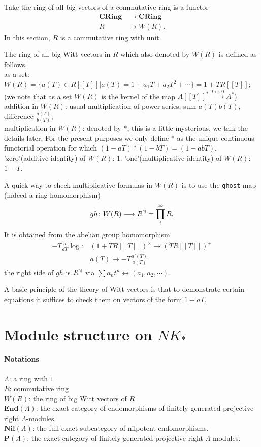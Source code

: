 Take the ring of all big vectors of a commutative ring is a functor 
\begin{align*}
\mathbf{CRing} &\longrightarrow \mathbf{CRing}\\
 R &\mapsto W(R).
\end{align*}
In this section, $R$ is a commutative ring with unit.
\begin{definition}
The ring of all big Witt vectors in $R$ which also denoted by $W(R)$ is defined as follows,\\
as a set: $W(R)=\{a(T)\in R[[T]]| a(T)=1+a_1T+a_2T^2+\cdots\}=1+TR[[T]]$; (we note that as a set $W(R)$ is the kernel of the map $A[[T]]^*\overset{T\mapsto 0}\longrightarrow A^*$)\\
addition in $W(R)$: usual multiplication of power series, sum $a(T)b(T)$, difference $\frac{a(T)}{b(T)}$;\\
multiplication in $W(R)$: denoted by $*$, this is a little mysterious, we talk the details later. For the present purposes we only define $*$ as the unique continuous functorial operation for which $(1-aT)*(1-bT)=(1-abT)$.\\
'zero'(additive identity) of $W(R)$: $1$.
'one'(multiplicative identity) of $W(R)$: $1-T$.
\end{definition}
A quick way to check multiplicative formulas in $W(R)$ is to use the \texttt{ghost} map (indeed a ring homomorphism)
\[gh\colon W(R)\longrightarrow R^{\mathbb{N}} =\prod_i^\infty R. \]
It is obtained from the abelian group homomorphism
\begin{align*}
-T \frac{d}{dT}\log \colon& (1+TR[[T]])^{\times} \longrightarrow (TR[[T]])^+\\
& a(T)\mapsto -T \frac{a'(T)}{a(T)}
\end{align*}
the right side of $gh$ is $R^{\mathbb{N}}$ via $\sum a_nt^n \longleftrightarrow (a_1,a_2,\cdots)$.

A basic principle of the theory of Witt vectors is that to demonstrate certain equations it suffices to check them on vectors of the form $1-aT$.
\section{Module structure on $NK_*$} %
\label{sec:module_structure_on_}
\paragraph{Notations} $\Lambda$: a ring with $1$\\
$R$: commutative ring \\
$W(R)$: the ring of big Witt vectors of $R$\\
$\mathbf{End}(\Lambda)$: the exact category of endomorphisms of finitely generated projective right $\Lambda$-modules.\\
$\mathbf{Nil}(\Lambda)$: the full exact subcategory of nilpotent endomorphisms.\\
$\mathbf{P}(\Lambda)$: the exact category of finitely generated projective right $\Lambda$-modules.

